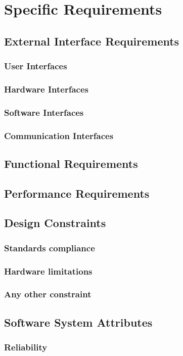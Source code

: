 \documentclass[12pt,a4paper]{article}
\begin{document}
\section{Specific Requirements}
\subsection{External Interface Requirements}
\subsubsection{User Interfaces}
\subsubsection{Hardware Interfaces}
\subsubsection{Software Interfaces}
\subsubsection{Communication Interfaces}
\subsection{Functional Requirements}
\subsection{Performance Requirements}
\subsection{Design Constraints}
\subsubsection{Standards compliance}
\subsubsection{Hardware limitations}
\subsubsection{Any other constraint}
\subsection{Software System Attributes}
\subsubsection{Reliability}
\end{document}

